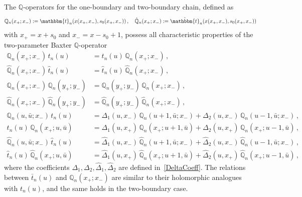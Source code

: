 \documentclass[a4paper,11pt]{article}
\numberwithin{equation}{section}
\begin{document}
The $\mathbb{Q}$-operators for the one-boundary and two-boundary chain, defined as 
\begin{align*}
	\mathbb{Q}_n(x_+;x_-) := \mathbbm{t}_n(x(x_+,x_-), s_0(x_+,x_-)) \,, \quad
	\hat{\mathbb{Q}}_n(x_+;x_-) := \hat{\mathbbm{t}}_n(x(x_+,x_-), s_0(x_+,x_-)) 
\end{align*}
with $x_+ = x+s_0$ and $x_- = x-s_0+1$, possess all characteristic properties of the two-parameter Baxter $\mathbb{Q}$-operator
\begin{align*}
	\mathbb{Q}_n(x_+;x_-)\,t_n(u) &= t_n(u)\,\mathbb{Q}_n(x_+;x_-) \,, \\
	\hat{\mathbb{Q}}_n(x_+;x_-)\,\hat{t}_n(u) &= \hat{t}_n(u)\,\hat{\mathbb{Q}}_n(x_+;x_-) \,, \\[1em]
	\mathbb{Q}_n(x_+;x_-)\,\mathbb{Q}_n(y_+;y_-) &= \mathbb{Q}_n(y_+;y_-)\,\mathbb{Q}_n(x_+;x_-) \,, \\
	\hat{\mathbb{Q}}_n(x_+;x_-)\,\hat{\mathbb{Q}}_n(y_+;y_-) &= \hat{\mathbb{Q}}_n(y_+;y_-)\,\hat{\mathbb{Q}}_n(x_+;x_-) \,, \\[1em]
	\mathbb{Q}_n(u,\bar{u};x_-)\,t_n(u) &= \Delta_1(u,x_-)\,\mathbb{Q}_n(u + 1,\bar{u};x_-) + \Delta_2(u,x_-)\,\mathbb{Q}_n(u - 1,\bar{u};x_-) \,, \\
	t_n(u)\,\mathbb{Q}_n(x_+;u,\bar{u}) &= \Delta_1(u,x_+)\,\mathbb{Q}_n(x_+;u + 1,\bar{u}) + \Delta_2(u,x_+)\,\mathbb{Q}_n(x_+;u - 1,\bar{u}) \,, \\[1em]
	\hat{\mathbb{Q}}_n(u,\bar{u};x_-)\,\hat{t}_n(u) &= \hat{\Delta}_1(u,x_-)\,\hat{\mathbb{Q}}_n(u + 1,\bar{u};x_-) + \hat{\Delta}_2(u,x_-)\,\hat{\mathbb{Q}}_n(u - 1,\bar{u};x_-) \,, \\
	\hat{t}_n(u)\,\hat{\mathbb{Q}}_n(x_+;u,\bar{u}) &= \hat{\Delta}_1(u,x_+)\,\hat{\mathbb{Q}}_n(x_+;u + 1,\bar{u}) + \hat{\Delta}_2(u,x_+)\,\hat{\mathbb{Q}}_n(x_+;u - 1,\bar{u}) \,,
\end{align*}
where the coefficients $\Delta_1, \Delta_2, \hat{\Delta}_1, \hat{\Delta}_2$ are defined in~\eqref{DeltaCoeff}.
The relations between $\bar{t}_n(u)$ and $\mathbb{Q}_n(x_+;x_-)$ are similar to their holomorphic analogues with $t_n(u)$, and the same holds in the two-boundary case.
\end{document}
